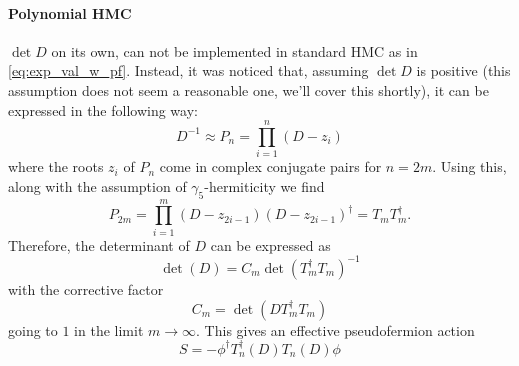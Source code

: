 \documentclass[a4paper,10pt]{book}
\begin{document}
\paragraph{Polynomial HMC}
$\operatorname{det} D$ on its own, can not be implemented in standard HMC as in \eqref{eq:exp_val_w_pf}. Instead, it was noticed that, assuming $\operatorname{det} D$ is positive (this assumption does not seem a reasonable one, we'll cover this shortly), it can be expressed in the following way:
\begin{equation}
D^{-1} \approx P_{n} = \prod_{i=1}^{n}\left(D-z_{i}\right)
\end{equation}
where the roots $z_i$ of $P_{n}$ come in complex conjugate pairs for $n=2m$. Using this, along with the assumption of $\gamma_5$-hermiticity we find
\begin{equation}
P_{2 m}=\prod_{i=1}^{m}\left(D-z_{2 i-1}\right)\left(D-z_{2 i-1}\right)^\dagger = T_mT_m^\dagger.
\end{equation}
Therefore, the determinant of $D$ can be expressed as
\begin{equation}
\operatorname{det}(D)=C_{m} \operatorname{det}\left(T_{m}^{\dagger} T_{m}\right)^{-1}
\end{equation}
with the corrective factor 
\begin{equation}
C_{m}= \operatorname{det}\left(DT_{m}^{\dagger} T_{m}\right)
\end{equation}
going to $1$ in the limit $m\rightarrow \infty$. This gives an effective pseudofermion action
\begin{equation}
S=-\phi^{\dagger} T_{n}^{\dagger}(D) T_{n}(D) \phi
\end{equation}
\end{document}
